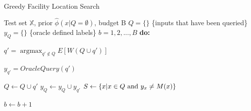 \documentclass[10pt, conference]{IEEEtran}
\DeclareMathOperator*{\argmax}{argmax}
\begin{document}
\begin{algorithm}
	\caption{Greedy Facility Location Search}
	\label{alg:Greedy}
	\begin{algorithmic}
		 Test set $\mathbb{X}$, prior $\hat{\phi}\left(x|Q=\emptyset\right)$, budget B
		\STATE $Q=\{\}$ \{inputs that have been queried\}
		\STATE $y_Q = \{\}$ \{oracle defined labels\}
		 $b = 1, 2, ..., B$ {\bfseries do:}

		\STATE $q' = \argmax_{q' \not\in Q} E \left[W\left(Q \cup q'\right) \right]$

		\STATE $y_{q'} = OracleQuery(q')$

		\STATE $Q \leftarrow Q \cup q'$
		\STATE $y_Q \leftarrow y_Q \cup y_{q'}$
		\STATE $S \leftarrow \left\{x | x \in Q \space \text{ and } y_x \neq M(x) \right\}$

		\STATE $b \leftarrow b + 1$
			

	\end{algorithmic}
\end{algorithm}

\end{document}
